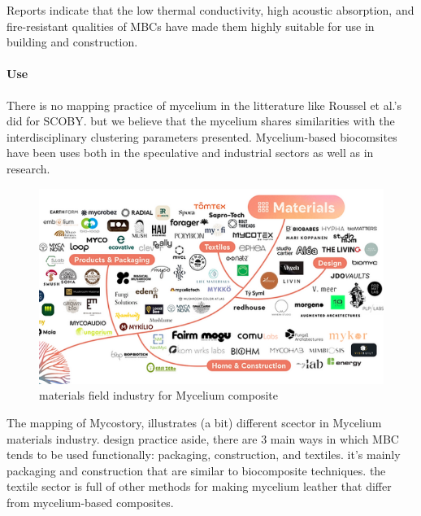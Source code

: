 Reports indicate that the low thermal conductivity, high acoustic absorption, and fire-resistant qualities of MBCs have made them highly suitable for use in building and construction. \cite{ghazvinian2019mycelium}

\paragraph{Use}

There is no mapping practice of mycelium in the litterature like Roussel et al.'s \cite{roussel2023processes} did for SCOBY. but we believe that the mycelium shares similarities with the interdisciplinary clustering parameters presented.
Mycelium-based biocomsites have been uses both in the speculative and industrial sectors as well as in research.

\begin{figure}[h]
    \centering
    \includegraphics{images/mycelium-indus-tree.png}
    \caption{materials field industry for Mycelium composite}
    \label{fig:indus-tree}
\end{figure}

The mapping of Mycostory, illustrates (a bit) different scector in Mycelium materials industry. design practice aside, there are 3 main ways in which MBC tends to be used functionally: packaging, construction, and textiles. 
it's mainly packaging and construction that are similar to biocomposite techniques. the textile sector is full of other methods for making mycelium leather that differ from mycelium-based composites. 




